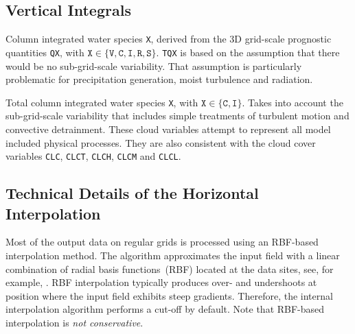 \subsection{Vertical Integrals}
\begin{description}[leftmargin=3.0cm,style=sameline]
 \item [TQX]      Column integrated water species \texttt{X}, derived from the 3D grid-scale prognostic quantities \texttt{QX}, 
                  with $\texttt{X}\in \{\texttt{V}, \texttt{C}, \texttt{I}, \texttt{R}, \texttt{S}\}$. \texttt{TQX} is based 
                  on the assumption that there would be no sub-grid-scale variability. That assumption is particularly problematic 
                  for precipitation generation, moist turbulence and radiation.

 \item [TQX\_DIA] Total column integrated water species \texttt{X}, with $\texttt{X}\in \{\texttt{C}, \texttt{I}\}$. 
                  Takes into account the sub-grid-scale variability that includes simple treatments of turbulent motion and convective 
                  detrainment. These cloud variables attempt to represent all model included physical processes. They are also 
                  consistent with the cloud cover variables \texttt{CLC}, \texttt{CLCT}, \texttt{CLCH}, \texttt{CLCM} and \texttt{CLCL}. 
\end{description}


\subsection{Technical Details of the Horizontal Interpolation}
\label{section:technical_details_of_the_horizontal_interpolation}

Most of the output data on regular grids is processed using an RBF-based interpolation method.
The algorithm  approximates the input field with a linear combination of 
radial basis functions~(RBF) located at the data sites, see, for example, \cite{Ruppert2007}.
RBF interpolation typically produces over- and undershoots at position where the input field
exhibits steep gradients.
Therefore, the internal interpolation algorithm performs a cut-off by default.
Note that RBF-based interpolation is \emph{not conservative}.\\


